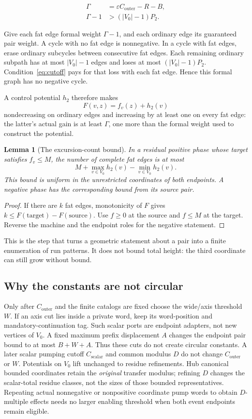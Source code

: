 \documentclass[11pt,a4paper]{article}
\newtheorem{lemma}[theorem]{Lemma}
\theoremstyle{remark}
\newcommand{\Co}{C_{\mathrm{outer}}}
\newcommand{\Cs}{C_{\mathrm{scalar}}}
\begin{document}
\begin{equation}
\begin{aligned}\Gamma&=\varepsilon\Co-R-B,\\ \Gamma-1&>(|V_0|-1)P_2.\end{aligned}\label{eq:cutoff}
\end{equation}


Give each fat edge formal weight \(\Gamma-1\), and each ordinary
edge its guaranteed pair weight. A cycle with no fat edge is
nonnegative. In a cycle with fat edges, erase ordinary subcycles
between consecutive fat edges. Each remaining ordinary subpath has
at most \(|V_0|-1\) edges and loses at most \((|V_0|-1)P_2\).
Condition~\eqref{eq:cutoff} pays for that loss with each fat edge.
Hence this formal graph has no negative cycle.

A control potential \(h_2\) therefore makes
\[
 F(v,z)=f_v(z)+h_2(v)
\]
nondecreasing on ordinary edges and increasing by at least one on
every fat edge: the latter's actual gain is at least \(\Gamma\), one
more than the formal weight used to construct the potential.

\begin{lemma}[The excursion-count bound]\label{lem:count}
In a residual positive phase whose target satisfies \(f_v\le M\),
the number of complete fat edges is at most
\[
 M+\max_{v\in V_0}h_2(v)-\min_{v\in V_0}h_2(v).
\]
This bound is uniform in the unrestricted coordinates of both endpoints.
A negative phase has the corresponding bound from its source pair.
\end{lemma}
\begin{proof}
If there are \(k\) fat edges, monotonicity of \(F\) gives
\(k\le F(\text{target})-F(\text{source})\).
Use \(f\ge0\) at the source and \(f\le M\) at the target.
Reverse the machine and the endpoint roles for the negative statement.
\end{proof}
This is the step that turns a geometric statement about a pair into a
finite enumeration of run patterns. It does not bound total height:
the third coordinate can still grow without bound.

\subsection{Why the constants are not circular}

Only after \(\Co\) and the finite catalogs are fixed choose the wide/axis threshold \(W\). If an axis cut lies inside a private word, keep its word-position and mandatory-continuation tag. Such scalar ports are endpoint adapters, not new vertices of \(V_0\). A fixed maximum prefix displacement \(A\) changes the endpoint pair bound to at most \(B+W+A\). Thus these cuts do not create circular constants. A later scalar pumping cutoff \(\Cs\) and common modulus \(D\) do not change \(\Co\) or \(W\). Potentials on \(V_0\) lift unchanged to residue refinements. Hub canonical bounded coordinates retain the \emph{original} transfer modulus; refining \(D\) changes the scalar-total residue classes, not the sizes of those bounded representatives. Repeating actual nonnegative or nonpositive coordinate pump words to obtain \(D\)-multiple effects needs no larger enabling threshold when both event endpoints remain eligible.
\end{document}
